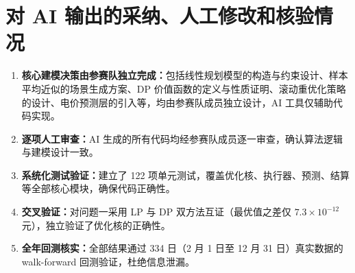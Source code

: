 \documentclass[a4paper,12pt]{ctexart}
\begin{document}
\section{对 AI 输出的采纳、人工修改和核验情况}

\begin{enumerate}
\item \textbf{核心建模决策由参赛队独立完成：}包括线性规划模型的构造与约束设计、样本平均近似的场景生成方案、DP 价值函数的定义与性质证明、滚动重优化策略的设计、电价预测层的引入等，均由参赛队成员独立设计，AI 工具仅辅助代码实现。
\item \textbf{逐项人工审查：}AI 生成的所有代码均经参赛队成员逐一审查，确认算法逻辑与建模设计一致。
\item \textbf{系统化测试验证：}建立了 122 项单元测试，覆盖优化核、执行器、预测、结算等全部核心模块，确保代码正确性。
\item \textbf{交叉验证：}对问题一采用 LP 与 DP 双方法互证（最优值之差仅 $7.3\times10^{-12}$ 元），独立验证了优化核的正确性。
\item \textbf{全年回测核实：}全部结果通过 334 日（2 月 1 日至 12 月 31 日）真实数据的 walk-forward 回测验证，杜绝信息泄漏。
\end{enumerate}
\end{document}
